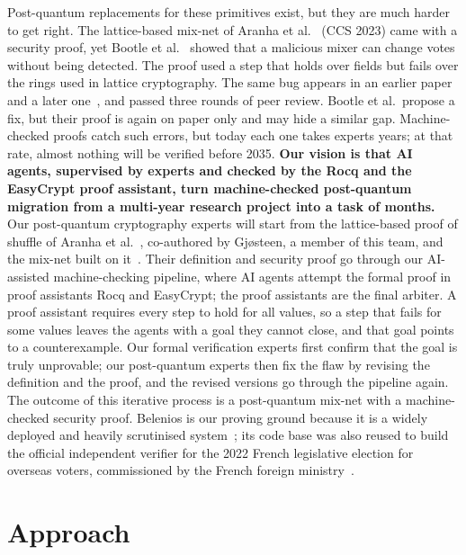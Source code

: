 \documentclass[11pt]{article}
\begin{document}
Post-quantum replacements for these primitives exist, but they are much harder to get right.
The lattice-based mix-net of Aranha et al.~\cite{aranha2023mixnet} (CCS 2023) came with a security proof, yet Bootle 
et al.~\cite{bootle2025mixnets} showed that a malicious mixer can change votes without
being detected. The proof used a step that holds over fields but fails over the rings used in lattice cryptography.
The same bug appears in an earlier paper~\cite{aranha2021shuffle} and a later one~\cite{hough2025cic}, and passed
three rounds of peer review. Bootle et al.\ propose a fix, but their proof is again on paper only and may hide a
similar gap. Machine-checked proofs catch such errors, but today each one takes experts years; at that rate, almost
nothing will be verified before 2035. \textbf{Our vision is that AI agents, supervised by experts and checked by the Rocq and 
the EasyCrypt proof assistant, turn machine-checked post-quantum migration from a multi-year research project into a task of months.} 
Our post-quantum cryptography experts will start from the lattice-based proof of shuffle of Aranha et al.~\cite{aranha2021shuffle},
co-authored by Gj{\o}steen, a member of this team, and the mix-net built on it~\cite{aranha2023mixnet}.
Their definition and security proof go through our AI-assisted machine-checking pipeline, where AI agents attempt the
formal proof in proof assistants Rocq and EasyCrypt; the proof assistants are the final arbiter. A proof assistant requires
every step to hold for all values, so a step that fails for some values leaves the agents with a goal they cannot close,
and that goal points to a counterexample. Our formal verification experts first confirm that the goal is truly unprovable;
our post-quantum experts then fix the flaw by revising the definition and the proof, and the revised versions go through
the pipeline again.
The outcome of this iterative process is a post-quantum mix-net with a machine-checked security proof. Belenios is our 
proving ground because it is a widely deployed 
and heavily scrutinised system~\cite{cortier2017sp,cortier2018belenioseasycrypt}; its code base was also reused to build 
the official independent verifier for the 2022 French legislative election for overseas voters, commissioned by the 
French foreign ministry~\cite{vvfe,cortier2023french}.

\section{Approach}
\end{document}
